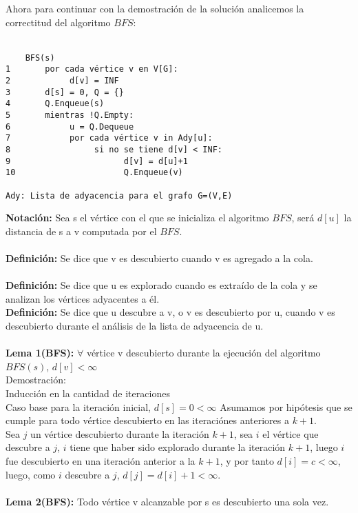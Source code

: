 \documentclass[12pt]{article}
\begin{document}
Ahora para continuar con la demostraci\'on de la soluci\'on analicemos la correctitud del algoritmo $BFS$:\\
\\

\begin{verbatim}
    BFS(s)
1       por cada vértice v en V[G]:
2            d[v] = INF
3       d[s] = 0, Q = {}
4       Q.Enqueue(s)
5       mientras !Q.Empty:
6            u = Q.Dequeue
7            por cada vértice v in Ady[u]:
8                 si no se tiene d[v] < INF:
9                       d[v] = d[u]+1
10                      Q.Enqueue(v)

Ady: Lista de adyacencia para el grafo G=(V,E)
\end{verbatim}

\textbf{Notaci\'on:} Sea s el v\'ertice con el que se inicializa el algoritmo $BFS$, ser\'a $d[u]$ la distancia de s a v computada por el $BFS$.\\
\\
\textbf{Definici\'on:} Se dice que v es descubierto cuando v es agregado a la cola.\\
\\
\textbf{Definici\'on:} Se dice que u es explorado cuando es extra\'ido de la cola y se analizan los v\'ertices adyacentes a \'el.\\
\textbf{Definici\'on:} Se dice que u descubre a v, o v es descubierto por u, cuando v es descubierto durante el an\'alisis de la lista 
de adyacencia de u.\\
\\

\textbf{Lema 1(BFS):} $\forall$ v\'ertice v descubierto durante la ejecuci\'on del algoritmo $BFS(s)$, 
$d[v] < \infty$\\

Demostraci\'on:\\
Inducci\'on en la cantidad de  iteraciones\\
Caso base para la iteraci\'on inicial,  $d[s]= 0 < \infty$
Asumamos por hip\'otesis que se cumple para todo v\'ertice descubierto en las iteraci\'ones anteriores a $k+1$.\\
Sea $j$ un v\'ertice descubierto durante la iteraci\'on $k + 1$, sea $i$ el v\'ertice que descubre a $j$, $i$ tiene que haber sido explorado 
durante la iteraci\'on $k + 1$, luego $i$ fue descubierto en una iteraci\'on anterior a la $k+1$, y por tanto 
$d[i] = c <\infty $, luego, como $ i$ descubre a $j$, 
$d[j] = d[i] + 1 < \infty$.\\
\\
\textbf{Lema 2(BFS):} Todo v\'ertice v alcanzable por s es descubierto una sola vez.\\
\end{document}
